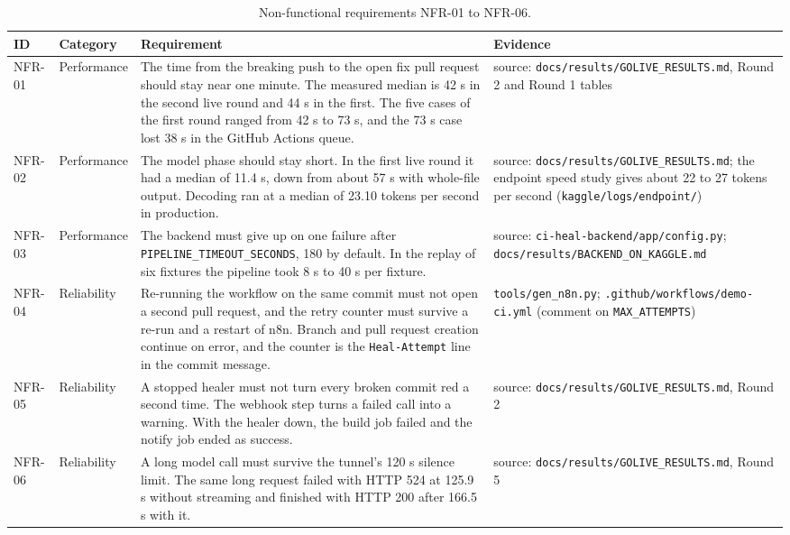 \begin{table}[!htbp]
\centering
\small
\begin{tabularx}{\linewidth}{>{\raggedright\arraybackslash}p{1.4cm}>{\raggedright\arraybackslash}p{2.3cm}>{\raggedright\arraybackslash}X>{\raggedright\arraybackslash}X}
\toprule
\textbf{ID} & \textbf{Category} & \textbf{Requirement} & \textbf{Evidence} \\
\midrule
NFR-01 & Performance & The time from the breaking push to the open fix pull request should stay near one minute. The measured median is 42 s in the second live round and 44 s in the first. The five cases of the first round ranged from 42 s to 73 s, and the 73 s case lost 38 s in the GitHub Actions queue. & source: \texttt{docs/\allowbreak{}results/\allowbreak{}GOLIVE\_\allowbreak{}RESULTS.md}, Round 2 and Round 1 tables \\
NFR-02 & Performance & The model phase should stay short. In the first live round it had a median of 11.4 s, down from about 57 s with whole-file output. Decoding ran at a median of 23.10 tokens per second in production. & source: \texttt{docs/\allowbreak{}results/\allowbreak{}GOLIVE\_\allowbreak{}RESULTS.md}; the endpoint speed study gives about 22 to 27 tokens per second (\texttt{kaggle/\allowbreak{}logs/\allowbreak{}endpoint/\allowbreak{}}) \\
NFR-03 & Performance & The backend must give up on one failure after \texttt{PIPELINE\_TIMEOUT\_SECONDS}, 180 by default. In the replay of six fixtures the pipeline took 8 s to 40 s per fixture. & source: \texttt{ci-heal-backend/\allowbreak{}app/\allowbreak{}config.py}; \texttt{docs/\allowbreak{}results/\allowbreak{}BACKEND\_\allowbreak{}ON\_\allowbreak{}KAGGLE.md} \\
NFR-04 & Reliability & Re-running the workflow on the same commit must not open a second pull request, and the retry counter must survive a re-run and a restart of n8n. Branch and pull request creation continue on error, and the counter is the \texttt{Heal-Attempt} line in the commit message. & \texttt{tools/\allowbreak{}gen\_\allowbreak{}n8n.py}; \texttt{.github/\allowbreak{}workflows/\allowbreak{}demo-ci.yml} (comment on \texttt{MAX\_ATTEMPTS}) \\
NFR-05 & Reliability & A stopped healer must not turn every broken commit red a second time. The webhook step turns a failed call into a warning. With the healer down, the build job failed and the notify job ended as success. & source: \texttt{docs/\allowbreak{}results/\allowbreak{}GOLIVE\_\allowbreak{}RESULTS.md}, Round 2 \\
NFR-06 & Reliability & A long model call must survive the tunnel's 120 s silence limit. The same long request failed with HTTP 524 at 125.9 s without streaming and finished with HTTP 200 after 166.5 s with it. & source: \texttt{docs/\allowbreak{}results/\allowbreak{}GOLIVE\_\allowbreak{}RESULTS.md}, Round 5 \\
\bottomrule
\end{tabularx}
\caption{Non-functional requirements NFR-01 to NFR-06.}
\label{tab:nfr1}
\end{table}

